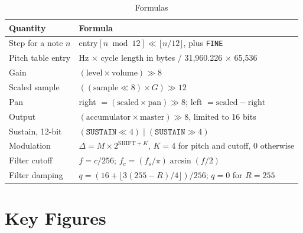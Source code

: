 \begin{table}[H]
	\centering
	\begin{tabular}{ll}
		\toprule
		\textbf{Quantity}   & \textbf{Formula}                                                                                 \\
		\midrule
		Step for a note $n$ & entry$[n \bmod 12] \ll \lfloor n/12 \rfloor$, plus \texttt{FINE}                                 \\
		Pitch table entry   & Hz $\times$ cycle length in bytes / 31,960.226 $\times$ 65,536                                   \\
		Gain                & $(\mathrm{level} \times \mathrm{volume}) \gg 8$                                                  \\
		Scaled sample       & $((\mathrm{sample} \ll 8) \times G) \gg 12$                                                      \\
		Pan                 & right $= (\mathrm{scaled} \times \mathrm{pan}) \gg 8$; left $= \mathrm{scaled} - \mathrm{right}$ \\
		Output              & $(\mathrm{accumulator} \times \mathrm{master}) \gg 8$, limited to 16 bits                        \\
		Sustain, 12-bit     & $(\texttt{SUSTAIN} \ll 4) \mathbin{|} (\texttt{SUSTAIN} \gg 4)$                                  \\
		Modulation          & $\Delta = M \times 2^{\mathrm{SHIFT} + K}$, $K = 4$ for pitch and cutoff, 0 otherwise            \\
		Filter cutoff       & $f = c / 256$; $f_c = (f_s / \pi) \arcsin(f / 2)$                                                \\
		Filter damping      & $q = (16 + \lfloor 3 (255 - R) / 4 \rfloor) / 256$; $q = 0$ for $R = 255$                        \\
		\bottomrule
	\end{tabular}
	\caption{Formulas}
	\label{tab:qr-formulas}
\end{table}

\section{Key Figures}

